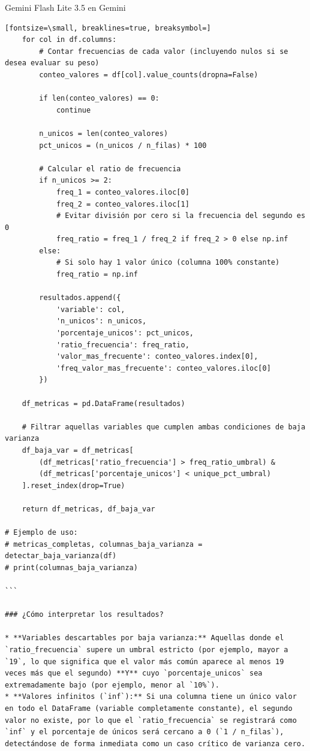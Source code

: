 \documentclass[12pt,a4paper,oneside]{book}
\begin{document}
\begin{iaresp}{Gemini Flash Lite 3.5 en Gemini}
\begin{Verbatim}[fontsize=\small, breaklines=true, breaksymbol=]
    for col in df.columns:
        # Contar frecuencias de cada valor (incluyendo nulos si se desea evaluar su peso)
        conteo_valores = df[col].value_counts(dropna=False)
        
        if len(conteo_valores) == 0:
            continue
            
        n_unicos = len(conteo_valores)
        pct_unicos = (n_unicos / n_filas) * 100
        
        # Calcular el ratio de frecuencia
        if n_unicos >= 2:
            freq_1 = conteo_valores.iloc[0]
            freq_2 = conteo_valores.iloc[1]
            # Evitar división por cero si la frecuencia del segundo es 0
            freq_ratio = freq_1 / freq_2 if freq_2 > 0 else np.inf
        else:
            # Si solo hay 1 valor único (columna 100% constante)
            freq_ratio = np.inf
            
        resultados.append({
            'variable': col,
            'n_unicos': n_unicos,
            'porcentaje_unicos': pct_unicos,
            'ratio_frecuencia': freq_ratio,
            'valor_mas_frecuente': conteo_valores.index[0],
            'freq_valor_mas_frecuente': conteo_valores.iloc[0]
        })
        
    df_metricas = pd.DataFrame(resultados)
    
    # Filtrar aquellas variables que cumplen ambas condiciones de baja varianza
    df_baja_var = df_metricas[
        (df_metricas['ratio_frecuencia'] > freq_ratio_umbral) & 
        (df_metricas['porcentaje_unicos'] < unique_pct_umbral)
    ].reset_index(drop=True)
    
    return df_metricas, df_baja_var

# Ejemplo de uso:
# metricas_completas, columnas_baja_varianza = detectar_baja_varianza(df)
# print(columnas_baja_varianza)

```

### ¿Cómo interpretar los resultados?

* **Variables descartables por baja varianza:** Aquellas donde el `ratio_frecuencia` supere un umbral estricto (por ejemplo, mayor a `19`, lo que significa que el valor más común aparece al menos 19 veces más que el segundo) **Y** cuyo `porcentaje_unicos` sea extremadamente bajo (por ejemplo, menor al `10%`).
* **Valores infinitos (`inf`):** Si una columna tiene un único valor en todo el DataFrame (variable completamente constante), el segundo valor no existe, por lo que el `ratio_frecuencia` se registrará como `inf` y el porcentaje de únicos será cercano a 0 (`1 / n_filas`), detectándose de forma inmediata como un caso crítico de varianza cero.
\end{Verbatim}
\end{iaresp}
\end{document}
